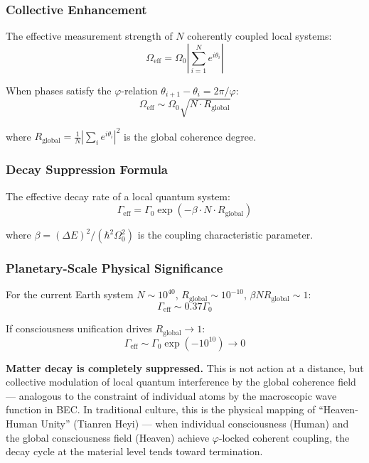 \documentclass[12pt,a4paper,twocolumn]{article}
\renewcommand{\phi}{\varphi}
\begin{document}
\subsubsection{Collective Enhancement}

The effective measurement strength of $N$ coherently coupled local systems:
$$\Omega_{\text{eff}} = \Omega_0 \left|\sum_{i=1}^N e^{i\theta_i}\right|$$

When phases satisfy the $\phi$-relation $\theta_{i+1}-\theta_i = 2\pi/\phi$:
$$\Omega_{\text{eff}} \sim \Omega_0\sqrt{N\cdot R_{\text{global}}}$$

where $R_{\text{global}} = \frac{1}{N}\left|\sum_i e^{i\theta_i}\right|^2$ is the global coherence degree.

\subsubsection{Decay Suppression Formula}

The effective decay rate of a local quantum system:
\begin{equation}
\Gamma_{\text{eff}} = \Gamma_0 \exp\left(-\beta \cdot N \cdot R_{\text{global}}\right)
\end{equation}

where $\beta = (\Delta E)^2/(\hbar^2\Omega_0^2)$ is the coupling characteristic parameter.

\subsubsection{Planetary-Scale Physical Significance}

For the current Earth system $N \sim 10^{40}$, $R_{\text{global}} \sim 10^{-10}$, $\beta N R_{\text{global}} \sim 1$:
$$\Gamma_{\text{eff}} \sim 0.37\Gamma_0$$

If consciousness unification drives $R_{\text{global}} \to 1$:
$$\Gamma_{\text{eff}} \sim \Gamma_0 \exp(-10^{10}) \to 0$$

\textbf{Matter decay is completely suppressed.} This is not action at a distance, but collective modulation of local quantum interference by the global coherence field --- analogous to the constraint of individual atoms by the macroscopic wave function in BEC. In traditional culture, this is the physical mapping of ``Heaven-Human Unity'' (Tianren Heyi) --- when individual consciousness (Human) and the global consciousness field (Heaven) achieve $\phi$-locked coherent coupling, the decay cycle at the material level tends toward termination.
\end{document}
